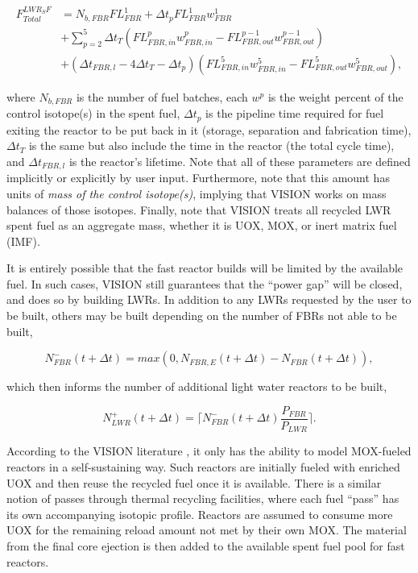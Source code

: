\begin{equation*}
\begin{aligned}
F^{LWR_SF}_{Total} & = N_{b,FBR} FL^1_{FBR} + \Delta t_p FL^1_{FBR} w^1_{FBR} \\
                   & + \sum_{p=2}^{5} \Delta t_T (FL^p_{FBR,in} w^p_{FBR,in} - FL^{p-1}_{FBR,out} w^{p-1}_{FBR,out}) \\
                   & + (\Delta t_{FBR,l} - 4 \Delta t_T - \Delta t_p) (FL^5_{FBR,in} w^5_{FBR,in} - FL^{5}_{FBR,out} w^{5}_{FBR,out}),
\end{aligned}
\end{equation*}

where $N_{b,FBR}$ is the number of fuel batches, each $w^p$ is the weight
percent of the control isotope(s) in the spent fuel, $\Delta t_p$ is the
pipeline time required for fuel exiting the reactor to be put back in it
(storage, separation and fabrication time), $\Delta t_T$ is the same but also
include the time in the reactor (the total cycle time), and $\Delta t_{FBR,l}$
is the reactor's lifetime. Note that all of these parameters are defined
implicitly or explicitly by user input. Furthermore, note that this amount has
units of \textit{mass of the control isotope(s)}, implying that VISION works on
mass balances of those isotopes. Finally, note that VISION treats all recycled
LWR spent fuel as an aggregate mass, whether it is UOX, MOX, or inert matrix
fuel (IMF).

It is entirely possible that the fast reactor builds will be limited by the
available fuel. In such cases, VISION still guarantees that the ``power gap''
will be closed, and does so by building LWRs. In addition to any LWRs requested
by the user to be built, others may be built depending on the number of FBRs not
able to be built,

\begin{equation*}
N^-_{FBR}\left(t+\Delta t\right) = 
                        max(0,N_{FBR,E}\left(t+\Delta t\right) - 
                        N_{FBR}\left(t+\Delta t\right)),
\end{equation*}

which then informs the number of additional light water reactors to be built,

\begin{equation*}
N^+_{LWR}\left(t+\Delta t\right) = \lceil N^-_{FBR}\left(t+\Delta t\right) 
                        \frac{P_{FBR}}{P_{LWR}} \rceil .
\end{equation*}

According to the VISION literature \cite{schweitzer_improved_2008}, it only has
the ability to model MOX-fueled reactors in a self-sustaining way. Such reactors
are initially fueled with enriched UOX and then reuse the recycled fuel once it
is available. There is a similar notion of passes through thermal recycling
facilities, where each fuel ``pass'' has its own accompanying isotopic
profile. Reactors are assumed to consume more UOX for the remaining reload
amount not met by their own MOX. The material from the final core ejection is
then added to the available spent fuel pool for fast reactors.


